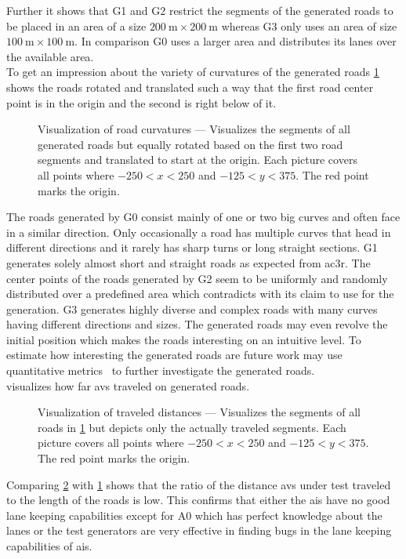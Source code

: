Further it shows that G1 and G2 restrict the segments of the generated roads to be placed in an area of a size \(\SI{200}{\metre}\times\SI{200}{\metre}\) whereas G3 only uses an area of size \(\SI{100}{\metre}\times\SI{100}{\metre}\).
In comparison G0 uses a larger area and distributes its lanes over the available area.\\
To get an impression about the variety of curvatures of the generated roads \cref{fig:roadCurvatureVisualization} shows the roads rotated and translated such a way that the first road center point is in the origin and the second is right below of it.
\begin{figure}
    \centering
    
    \medskip
    \caption{%
        Visualization of road curvatures --- Visualizes the segments of all generated roads but equally rotated based on the first two road segments and translated to start at the origin.
        Each picture covers all points where \(-250<x<250\) and \(-125<y<375\).
        The red point marks the origin.
    }\label{fig:roadCurvatureVisualization}
\end{figure}
The roads generated by G0 consist mainly of one or two big curves and often face in a similar direction.
Only occasionally a road has multiple curves that head in different directions and it rarely has sharp turns or long straight sections.
G1 generates solely almost short and straight roads as expected from \gls{ac3r}.
The center points of the roads generated by G2 seem to be uniformly and randomly distributed over a predefined area which contradicts with its claim to use \asfault{} for the generation.
G3 generates highly diverse and complex roads with many curves having different directions and sizes.
The generated roads may even revolve the initial position which makes the roads interesting on an intuitive level.
To estimate how interesting the generated roads are future work may use quantitative metrics~\cite{generationForRacingGames} to further investigate the generated roads.\\
 visualizes how far \glspl{av} traveled on generated roads.
\begin{figure}
    \centering
    
    \medskip
    \caption{%
        Visualization of traveled distances --- Visualizes the segments of all roads in \cref{fig:roadCurvatureVisualization} but depicts only the actually traveled segments.
        Each picture covers all points where \(-250<x<250\) and \(-125<y<375\).
        The red point marks the origin.
    }\label{fig:traveledDistancesVisualization}
\end{figure}
Comparing \cref{fig:traveledDistancesVisualization} with \cref{fig:roadCurvatureVisualization} shows that the ratio of the distance \glspl{av} under test traveled to the length of the roads is low.
This confirms that either the \glspl{ai} have no good lane keeping capabilities except for A0 which has perfect knowledge about the lanes or the test generators are very effective in finding bugs in the lane keeping capabilities of \glspl{ai}.

